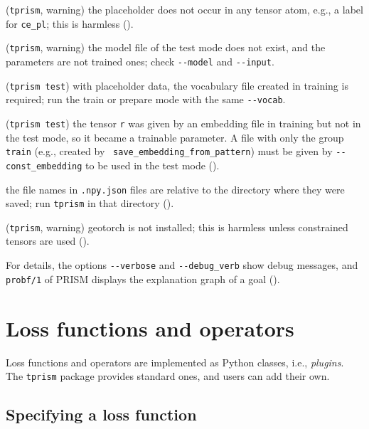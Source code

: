 \documentclass[a4paper]{report}
\begin{document}
\begin{description}
	({\tt tprism}, warning) the placeholder does not occur in any tensor atom,
	e.g., a label for {\tt ce\_pl}; this is harmless ().
	\item[{\tt [SKIP] skip loading: ... is not found}]
	({\tt tprism}, warning) the model file of the test mode does not exist, and
	the parameters are not trained ones; check {\tt -{}-model} and {\tt -{}-input}.
	\item[{\tt FileNotFoundError: ... vocab.pkl}]
	({\tt tprism test}) with placeholder data, the vocabulary file created in
	training is required; run the train or prepare mode with the same {\tt -{}-vocab}.
	\item[{\tt Missing key(s) in state\_dict: "tensor\_r\_"}]
	({\tt tprism test}) the tensor {\tt r} was given by an embedding file in
	training but not in the test mode, so it became a trainable parameter.  A
	file with only the group {\tt train} (e.g., created by {\tt
		save\_embedding\_from\_pattern}) must be given by {\tt -{}-const\_embedding}
	to be used in the test mode ().
	\item[{\tt FileNotFoundError} for an {\tt .npy} file]
	the file names in {\tt .npy.json} files are relative to the directory where
	they were saved; run {\tt tprism} in that directory ().
	\item[{\tt [geotorch] disabled}]
	({\tt tprism}, warning) geotorch is not installed; this is harmless unless
	constrained tensors are used ().
\end{description}
For details, the options {\tt -{}-verbose} and {\tt -{}-debug\_verb} show debug
messages, and {\tt probf/1} of PRISM displays the explanation graph of a goal
().

\chapter{Loss functions and operators}
\label{chap:loss_op}

Loss functions and operators are implemented as Python classes, i.e.,
{\em plugins}.  The {\tt tprism} package provides standard ones, and users
can add their own.

\section{Specifying a loss function}
\label{sec:specify_loss}
\end{document}
